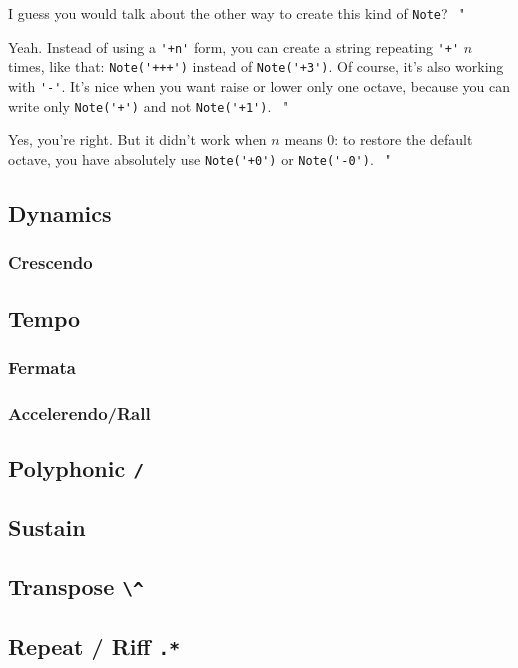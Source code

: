 \documentclass{article}
\newenvironment{meenv}{ \par \noindent \makebox[6em][r]{ \textcolor{mecolor}{Me}: " --~}}{~"}
\newenvironment{myselfenv}{ \par \noindent \makebox[6em][r]{ \textcolor{myselfcolor}{Myself}: " --~}}{~"}
\newcommand{ \me }[1]{%
\begin{meenv}%
	#1%
\end{meenv} }
\newcommand{ \myself }[1]{%
\begin{myselfenv}%
	#1%
\end{myselfenv} }
\begin{document}
\myself{ I guess you would talk about the other way to create this kind of \lstinline!Note!? }
\me{ Yeah. Instead of using a \lstinline!'+n'! form, you can create a string repeating \lstinline!'+'! $n$ times, like that: \lstinline!Note('+++')! instead of \lstinline!Note('+3')!. Of course, it's also working with \lstinline!'-'!. It's nice when you want raise or lower only one octave, because you can write only \lstinline!Note('+')! and not \lstinline!Note('+1')!. }
\myself{ Yes, you're right. But it didn't work when $n$ means $0$: to restore the default octave, you have absolutely use \lstinline!Note('+0')! or \lstinline!Note('-0')!. }

\subsection{Dynamics}
\subsubsection{Crescendo}

\subsection{Tempo}
\subsubsection{Fermata}
\subsubsection{Accelerendo/Rall}

\subsection{Polyphonic \lstinline!/!}

\subsection{Sustain}

\subsection{Transpose \lstinline!\^!}

\subsection{Repeat / Riff \lstinline!.*!}
\label{sec:RepeatRiff}
\end{document}
